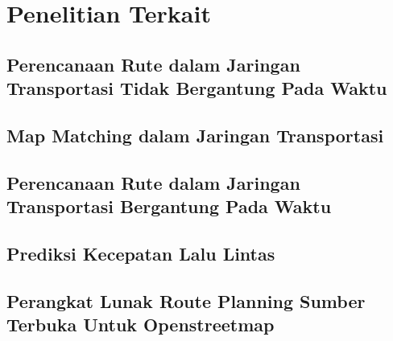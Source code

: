 \documentclass[ugmskripsi]{ugmskripsi}
\begin{document}


\chapter{Penelitian Terkait}
\label{IDENTIFIIKASI MASALAH DAN IDE INOVATIF}

	\section{Perencanaan Rute dalam Jaringan Transportasi Tidak Bergantung Pada Waktu}
	\label{identifikasi masalah dan ide inovatif identifikasi masalah}
	

        \section{Map Matching dalam Jaringan Transportasi}
	\label{Map Matching dalam Jaringan Transportasi}
	

    \section{Perencanaan Rute dalam Jaringan Transportasi Bergantung Pada Waktu}
    \label{Perencanaan Rute dalam Jaringan Transportasi Bergantung Pada Waktu}
    

    \section{Prediksi Kecepatan Lalu Lintas}
    \label{Prediksi Kecepatan Lalu Lintas}
    

    \section{Perangkat Lunak Route Planning Sumber Terbuka Untuk Openstreetmap}
    \label{Perangkat Lunak Route Planning Sumber Terbuka}
    
\end{document}
